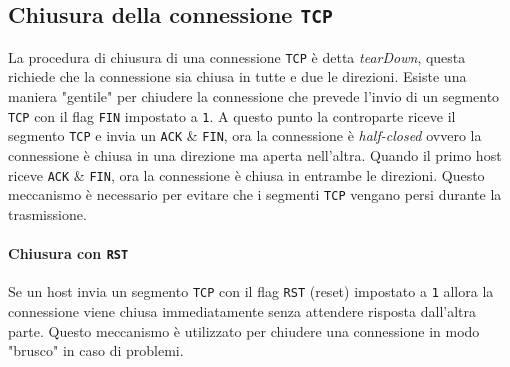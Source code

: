     \subsection{Chiusura della connessione \texttt{TCP}}
        La procedura di chiusura di una connessione \texttt{TCP} è detta \textit{tearDown}, questa richiede che la connessione sia chiusa in tutte e due le direzioni. Esiste una maniera "gentile" per chiudere la connessione che prevede l'invio di un segmento \texttt{TCP} con il flag \texttt{FIN} impostato a \texttt{1}. A questo punto la controparte riceve il segmento \texttt{TCP} e invia un \texttt{ACK} \& \texttt{FIN}, ora la connessione è \textit{half-closed} ovvero la connessione è chiusa in una direzione ma aperta nell'altra. Quando il primo host riceve \texttt{ACK} \& \texttt{FIN}, ora la connessione è chiusa in entrambe le direzioni. Questo meccanismo è necessario per evitare che i segmenti \texttt{TCP} vengano persi durante la trasmissione.
            \paragraph{Chiusura con \texttt{RST}} Se un host invia un segmento \texttt{TCP} con il flag \texttt{RST} (reset) impostato a \texttt{1} allora la connessione viene chiusa immediatamente senza attendere risposta dall'altra parte. Questo meccanismo è utilizzato per chiudere una connessione in modo "brusco" in caso di problemi.

